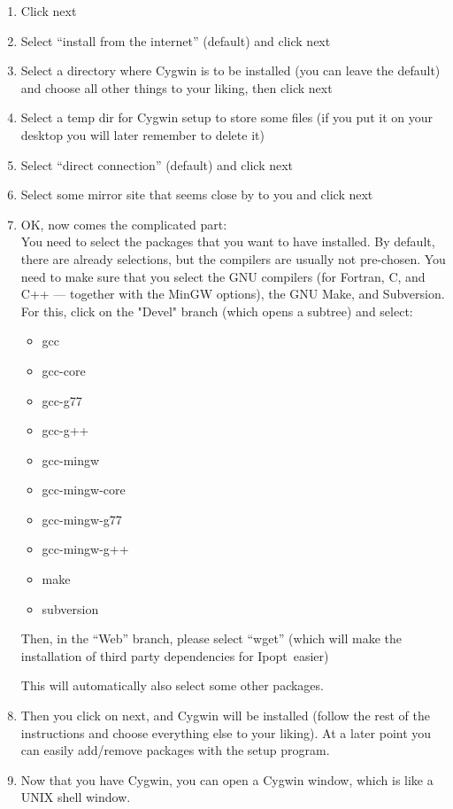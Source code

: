 \documentclass[letter,10pt]{article}
\newcommand{\Ipopt}{{\sc Ipopt}}
\begin{document}
\begin{enumerate}
\item Click next
\item Select ``install from the internet'' (default) and click next
\item Select a directory where Cygwin is to be installed (you can
  leave the default) and choose all other things to your liking, then
  click next
\item Select a temp dir for Cygwin setup to store some files (if you
  put it on your desktop you will later remember to delete it)
\item Select ``direct connection'' (default) and click next
\item Select some mirror site that seems close by to you and click next
\item OK, now comes the complicated part:\\
  You need to select the packages that you want to have installed.  By
  default, there are already selections, but the compilers are usually
  not pre-chosen.  You need to make sure that you select the GNU
  compilers (for Fortran, C, and C++ --- together with the MinGW
  options), the GNU Make, and Subversion.  For this, click on the "Devel"
  branch (which opens a subtree) and select:
  \begin{itemize}
  \item gcc
  \item gcc-core
  \item gcc-g77
  \item gcc-g++
  \item gcc-mingw
  \item gcc-mingw-core
  \item gcc-mingw-g77
  \item gcc-mingw-g++
  \item make
  \item subversion
  \end{itemize}

  Then, in the ``Web'' branch, please select ``wget'' (which will make
  the installation of third party dependencies for \Ipopt\ easier)

  This will automatically also select some other packages.
\item Then you click on next, and Cygwin will be installed (follow the
  rest of the instructions and choose everything else to your liking).
  At a later point you can easily add/remove packages with the setup
  program.

\item Now that you have Cygwin, you can open a Cygwin window, which is
  like a UNIX shell window.


\end{enumerate}
\end{document}
